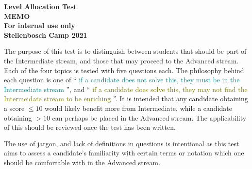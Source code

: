 \documentclass{article}
\newcommand{\mustintermediate}[1]{
    \textcolor{teal}{#1}
}
\newcommand{\canadvanced}[1]{
    \textcolor{olive}{#1}
}
\begin{document}
\thispagestyle{empty}

\begin{center}
  \textbf{\Large Level Allocation Test}
  \\ \vspace{1em}
  \textbf{\Large MEMO}
  \\ \vspace{1em}
  \textbf{\large For internal use only}
  \\ \vspace{1em}
  \textbf{\large Stellenbosch Camp 2021}
\end{center}

\vspace{24pt}

The purpose of this test is to distinguish between students that should be part of the Intermediate stream, and those that may proceed to the Advanced stream.
Each of the four topics is tested with five questions each.
The philosophy behind each question is one of ``\mustintermediate{if a candidate does not solve this, they must be in the Intermediate stream}'', and ``\canadvanced{if a candidate does solve this, they may not find the Intermeidate stream to be enriching}''.
It is intended that any candidate obtaining a score $\le 10$ would likely benefit more from Intermediate, while a candidate obtaining $> 10$ can perhaps be placed in the Advanced stream.
The applicability of this should be reviewed once the test has been written.  

The use of jargon, and lack of definitions in questions is intentional as this test aims to assess a candidate's familiarity with certain terms or notation which one should be comfortable with in the Advanced stream.
\end{document}
